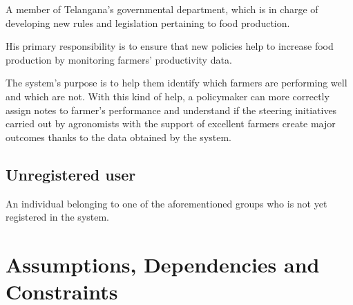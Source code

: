 A member of Telangana's governmental department, which is in charge of developing new rules and legislation pertaining to food production.

His primary responsibility is to ensure that new policies help to increase food production by monitoring farmers' productivity data.

The system's purpose is to help them identify which farmers are performing well and which are not. With this kind of help, a policymaker can more correctly assign notes to farmer's performance and understand if the steering initiatives carried out by agronomists with the support of excellent farmers create major outcomes thanks to the data obtained by the system.

\subsection{Unregistered user}

An individual belonging to one of the aforementioned groups who is not yet registered in the system.

\section{Assumptions, Dependencies and Constraints}

